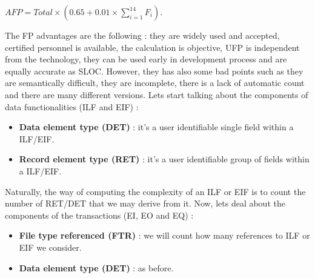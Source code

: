 \documentclass[11pt]{article}
\begin{document}
\begin{center}
$AFP = Total \times (0.65 + 0.01 \times \sum_{i=1}^{14} F_i)$.
\end{center}
The FP advantages are the following : they are widely used and accepted, certified personnel is available, the calculation is objective, UFP is independent from the technology, they can be used early in development process and are equally accurate as SLOC. However, they has also some bad points such as they are semantically difficult, they are incomplete, there is a lack of automatic count and there are many different versions. Lets start talking about the components of data functionalities (ILF and EIF) :
\begin{itemize}
\item \textbf{Data element type (DET)} : it's a user identifiable single field within a ILF/EIF.
\item \textbf{Record element type (RET)} : it's a user identifiable group of fields within a ILF/EIF.
\end{itemize}
Naturally, the way of computing the complexity of an ILF or EIF is to count the number of RET/DET that we may derive from it. Now, lets deal about the components of the transactions (EI, EO and EQ) : 
\begin{itemize}
\item \textbf{File type referenced (FTR)} : we will count how many references to ILF or EIF we consider.
\item \textbf{Data element type (DET)} : as before.
\end{itemize}
\end{document}
